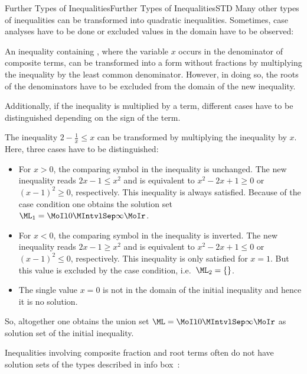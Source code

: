 \begin{MXContent}{Further Types of Inequalities}{Further Types of Inequalities}{STD}
Many other types of inequalities can be transformed into quadratic inequalities. Sometimes, 
case analyses have to be done or excluded values in the domain have to be observed:

\begin{MInfo}
An inequality containing , where the 
variable $x$ occurs in the denominator of composite terms, can be transformed into a 
form without fractions by multiplying the inequality by the least common denominator. 
However, in doing so, the roots of the denominators have to be excluded from the domain
of the new inequality. 

Additionally, if the inequality is multiplied by a term, different cases have to be distinguished 
depending on the sign of the term.
\end{MInfo}

\begin{MExample}
The inequality $2-\frac1x\leq x$ can be transformed by multiplying the inequality by $x$. Here, three 
cases have to be distinguished:
\begin{itemize}
\item{For $x>0$, the comparing symbol in the inequality is unchanged. The new inequality
reads $2x-1\leq x^2$ and is equivalent to $x^2-2x+1\geq 0$ or $(x-1)^2\geq 0$, respectively.
This inequality is always satisfied. Because of the case condition one obtains 
the solution set $\ML_1=\MoIl 0\MIntvlSep \infty\MoIr$.}
\item{For $x<0$, the comparing symbol in the inequality is inverted. The new inequality
reads $2x-1\geq x^2$ and is equivalent to $x^2-2x+1\leq 0$ or $(x-1)^2\leq 0$, respectively.
This inequality is only satisfied for $x=1$. But this value is excluded by the case condition, 
i.e.\ $\ML_2=\{\}$.}
\item{The single value $x=0$ is not in the domain of the initial inequality and hence it is
no solution.}
\end{itemize}

So, altogether one obtains the union set 
$\ML=\MoIl 0\MIntvlSep \infty\MoIr$ as solution set of the initial inequality.
\end{MExample}

Inequalities involving composite fraction and root terms often do not have solution
sets of the types described in info box~:


\end{MXContent}
